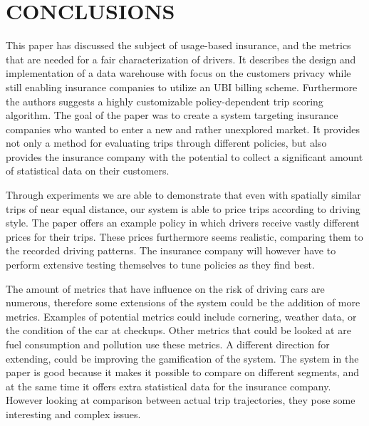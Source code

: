 \section{CONCLUSIONS}
This paper has discussed the subject of usage-based insurance, and the metrics that are needed for a fair characterization of drivers. It describes the design and implementation of a data warehouse with focus on the customers privacy while still enabling insurance companies to utilize an UBI billing scheme. Furthermore the authors suggests a highly customizable policy-dependent trip scoring algorithm.
The goal of the paper was to create a system targeting insurance companies who wanted to enter a new and rather unexplored market. It provides not only a method for evaluating trips through different policies, but also provides the insurance company with the potential to collect a significant amount of statistical data on their customers.

Through experiments we are able to demonstrate that even with spatially similar trips of near equal distance, our system is able to price trips according to driving style. The paper offers an example policy in which drivers receive vastly different prices for their trips. These prices furthermore seems realistic, comparing them to the recorded driving patterns. The insurance company will however have to perform extensive testing themselves to tune policies as they find best. 

The amount of metrics that have influence on the risk of driving cars are numerous, therefore some extensions of the system could be the addition of more metrics. Examples of potential metrics could include cornering, weather data, or the condition of the car at checkups. Other metrics that could be looked at are fuel consumption and pollution use these metrics.
A different direction for extending, could be improving the gamification of the system. The system in the paper is good because it makes it possible to compare on different segments, and at the same time it offers extra statistical data for the insurance company. However looking at comparison between actual trip trajectories, they pose some interesting and complex issues.


\addtolength{\textheight}{-12cm}   %
